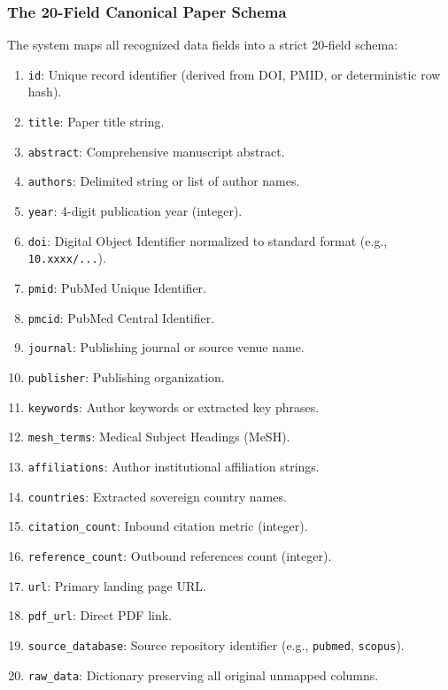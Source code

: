 \subsubsection{The 20-Field Canonical Paper Schema}
The system maps all recognized data fields into a strict 20-field schema:
\begin{enumerate}
    \item \texttt{id}: Unique record identifier (derived from DOI, PMID, or deterministic row hash).
    \item \texttt{title}: Paper title string.
    \item \texttt{abstract}: Comprehensive manuscript abstract.
    \item \texttt{authors}: Delimited string or list of author names.
    \item \texttt{year}: 4-digit publication year (integer).
    \item \texttt{doi}: Digital Object Identifier normalized to standard format (e.g., \texttt{10.xxxx/...}).
    \item \texttt{pmid}: PubMed Unique Identifier.
    \item \texttt{pmcid}: PubMed Central Identifier.
    \item \texttt{journal}: Publishing journal or source venue name.
    \item \texttt{publisher}: Publishing organization.
    \item \texttt{keywords}: Author keywords or extracted key phrases.
    \item \texttt{mesh\_terms}: Medical Subject Headings (MeSH).
    \item \texttt{affiliations}: Author institutional affiliation strings.
    \item \texttt{countries}: Extracted sovereign country names.
    \item \texttt{citation\_count}: Inbound citation metric (integer).
    \item \texttt{reference\_count}: Outbound references count (integer).
    \item \texttt{url}: Primary landing page URL.
    \item \texttt{pdf\_url}: Direct PDF link.
    \item \texttt{source\_database}: Source repository identifier (e.g., \texttt{pubmed}, \texttt{scopus}).
    \item \texttt{raw\_data}: Dictionary preserving all original unmapped columns.
\end{enumerate}

